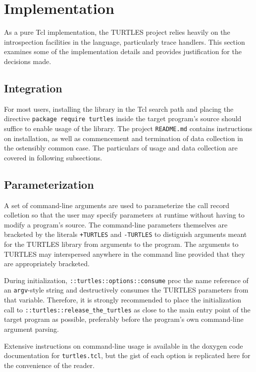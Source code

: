 \documentclass{article}[letter,10pt]
\begin{document}
\section{Implementation}{
  As a pure Tcl implementation, the TURTLES project relies heavily on the
  introspection facilities in the language, particularly trace handlers.
  This section examines some of the implementation details and provides
  justification for the decisions made.

  \subsection{Integration}{
    For most users, installing the library in the Tcl search path and placing
    the directive \texttt{package require turtles} inside the target program's source
    should suffice to enable usage of the library. The project \texttt{README.md} contains
    instructions on installation, as well as commencement and termination of data
    collection in the ostensibly common case. The particulars of usage and data collection
    are covered in following subsections.
  }

  \subsection{Parameterization}{
    A set of command-line arguments are used to parameterize the call record colletion
    so that the user may specify parameters at runtime without having to modify a program's source.
    The command-line parameters themselves are bracketed by the literals \texttt{+TURTLES} and \texttt{-TURTLES}
    to distiguish arguments meant for the TURTLES library from arguments to the program.
    The arguments to TURTLES may interspersed anywhere in the command line provided that
    they are appropriately bracketed.

    During initialization, \texttt{::turtles::options::consume} proc the name reference of an
    \texttt{argv}-style string and destructively consumes the TURTLES parameters from that variable.
    Therefore, it is  strongly recommended to place the initialization call to
    \texttt{::turtles::release\_the\_turtles} as close to the main entry point of the target program
    as possible, preferably before the program's own command-line argument parsing.

    Extensive instructions on command-line usage is available in the doxygen code documentation
    for \texttt{turtles.tcl}, but the gist of each option is replicated here for the convenience of the reader.

}}
\end{document}
